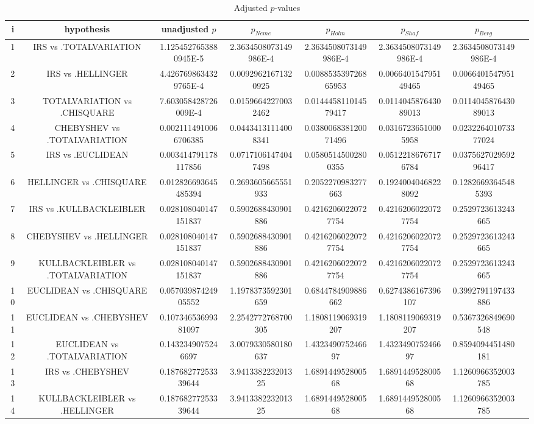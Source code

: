 \documentclass[a4paper,10pt]{article}
\begin{document}
\begin{landscape}
\begin{table}[!htp]
\centering\tiny
\caption{Adjusted $p$-values}
\begin{tabular}{cccccccc}
i&hypothesis&unadjusted $p$&$p_{Neme}$&$p_{Holm}$&$p_{Shaf}$&$p_{Berg}$\\
\hline
1&IRS vs .TOTALVARIATION&1.1254527653880945E-5&2.3634508073149986E-4&2.3634508073149986E-4&2.3634508073149986E-4&2.3634508073149986E-4\\
2&IRS vs .HELLINGER&4.4267698634329765E-4&0.00929621671320925&0.008853539726865953&0.006640154795149465&0.006640154795149465\\
3&TOTALVARIATION vs .CHISQUARE&7.603058428726009E-4&0.01596642270032462&0.014445811014579417&0.011404587643089013&0.011404587643089013\\
4&CHEBYSHEV vs .TOTALVARIATION&0.0021114910066706385&0.04434131114008341&0.038006838120071496&0.03167236510005958&0.023226401073377024\\
5&IRS vs .EUCLIDEAN&0.003414791178117856&0.07171061474047498&0.05805145002800355&0.05122186767176784&0.037562702959296417\\
6&HELLINGER vs .CHISQUARE&0.012826693645485394&0.2693605665551933&0.2052270983277663&0.19240040468228092&0.12826693645485393\\
7&IRS vs .KULLBACKLEIBLER&0.028108040147151837&0.5902688430901886&0.42162060220727754&0.42162060220727754&0.2529723613243665\\
8&CHEBYSHEV vs .HELLINGER&0.028108040147151837&0.5902688430901886&0.42162060220727754&0.42162060220727754&0.2529723613243665\\
9&KULLBACKLEIBLER vs .TOTALVARIATION&0.028108040147151837&0.5902688430901886&0.42162060220727754&0.42162060220727754&0.2529723613243665\\
10&EUCLIDEAN vs .CHISQUARE&0.05703987424905552&1.1978373592301659&0.6844784909886662&0.6274386167396107&0.3992791197433886\\
11&EUCLIDEAN vs .CHEBYSHEV&0.10734653699381097&2.2542772768700305&1.1808119069319207&1.1808119069319207&0.5367326849690548\\
12&EUCLIDEAN vs .TOTALVARIATION&0.1432349075246697&3.0079330580180637&1.432349075246697&1.432349075246697&0.8594094451480181\\
13&IRS vs .CHEBYSHEV&0.18768277253339644&3.941338223201325&1.689144952800568&1.689144952800568&1.1260966352003785\\
14&KULLBACKLEIBLER vs .HELLINGER&0.18768277253339644&3.941338223201325&1.689144952800568&1.689144952800568&1.1260966352003785\\

\end{tabular}
\end{table}
\end{landscape}
\end{document}
